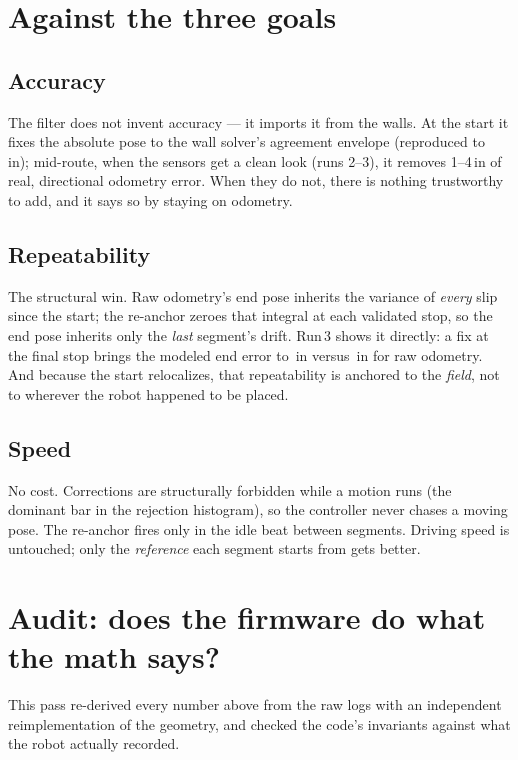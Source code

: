 \documentclass[11pt]{article}
\begin{document}
\section{Against the three goals}
\subsection{\faBullseye\; Accuracy}
The filter does not invent accuracy --- it imports it from the walls. At the start it
fixes the absolute pose to the wall solver's agreement envelope (reproduced to
\AuditWallMaxErr\,in); mid-route, when the sensors get a clean look (runs 2--3), it
removes \numrange{1}{4}\,in of real, directional odometry error. When they do not,
there is nothing trustworthy to add, and it says so by staying on odometry.

\subsection{\faSync\; Repeatability}
The structural win. Raw odometry's end pose inherits the variance of \emph{every}
slip since the start; the re-anchor zeroes that integral at each validated stop, so
the end pose inherits only the \emph{last} segment's drift. Run\,3 shows it
directly: a fix at the final stop brings the modeled end error to
\RunThreeNewEnd\,in versus \RunThreeRawEnd\,in for raw odometry. And because the
start relocalizes, that repeatability is anchored to the \emph{field}, not to
wherever the robot happened to be placed.

\subsection{\faBolt\; Speed}
No cost. Corrections are structurally forbidden while a motion runs (the dominant
bar in the rejection histogram), so the controller never chases a moving pose. The
re-anchor fires only in the idle beat between segments. Driving speed is untouched;
only the \emph{reference} each segment starts from gets better.

\section{Audit: does the firmware do what the math says?}\label{sec:audit}
This pass re-derived every number above from the raw logs with an independent
reimplementation of the geometry, and checked the code's invariants against what the
robot actually recorded.
\end{document}
